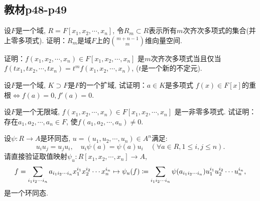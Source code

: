\subsection{教材p48-p49}

\begin{problem}
    设$F$是一个域, $R = F[x_1, x_2, \cdots, x_n]$,
令$R_m \subset R$表示所有$m$次齐次多项式的集合(并上零多项式).
证明：$R_m$是域$F$上的$\binom{m + n - 1}{m}$维向量空间.
\end{problem}

\begin{solution}
    
\end{solution}

\begin{problem}
    证明：$f(x_1, x_2, \cdots, x_n) \in F[x_1, x_2, \cdots, x_n]$
是$m$次齐次多项式当且仅当$f(tx_1, tx_2, \cdots, tx_n) = t^mf(x_1, x_2, \cdots, x_n)$,
($t$是一个新的不定元).
\end{problem}

\begin{solution}
    
\end{solution}

\begin{problem}
    设$F$是一个域, $K \supset F$是$F$的一个扩域, 试证明：$a\in K$是多项式
$f(x) \in F[x]$的重根$\Leftrightarrow f(a) = 0, f'(a) = 0$.
\end{problem}

\begin{solution}
    
\end{solution}

\begin{problem}
    设$F$是一个无限域, $f(x_1, x_2, \cdots ,x_n) \in F[x_1, x_2, \cdots,x_n]$
是一非零多项式. 试证明：存在$a_1, a_2, \cdots, a_n \in F$,
使$f(a_1, a_2, \cdots, a_n) \neq 0$.
\end{problem}

\begin{solution}
    
\end{solution}

\begin{problem}
    设$\psi:R \to A$是环同态,
$u = (u_1, u_2, \cdots, u_n) \in A^n$满足:
\[
    u_iu_j = u_ju_i,\quad u_i\psi(a) = \psi(a)u_i \quad (\forall a \in R, 1 \leqslant i, j \leqslant n).
\]
请直接验证取值映射$\psi_u:R[x_1, x_2, \cdots, x_n] \to A$,
\[
    f = \sum_{i_1i_2\cdots i_n} a_{i_1i_2\cdots i_n}x_1^{i_1}x_2^{i_2}\cdots x_n^{i_n}
    \mapsto \psi_u(f) \mathrel{\coloneqq} \sum_{i_1i_2\cdots i_n} \psi(a_{i_1i_2\cdots i_n})u_1^{i_1}u_2^{i_2}\cdots u_n^{i_n},
\]
是一个环同态.
\end{problem}

